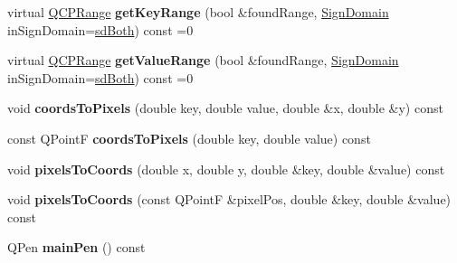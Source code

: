 \begin{DoxyCompactItemize}
\item 
\hypertarget{classQCPAbstractPlottable_a1acf2d2965d9b31328ec2cd018f9e0bc}{}virtual \hyperlink{classQCPRange}{Q\+C\+P\+Range} {\bfseries get\+Key\+Range} (bool \&found\+Range, \hyperlink{classQCPAbstractPlottable_a661743478a1d3c09d28ec2711d7653d8}{Sign\+Domain} in\+Sign\+Domain=\hyperlink{classQCPAbstractPlottable_a661743478a1d3c09d28ec2711d7653d8a082b98cfb91a7363a3b5cd17b0c1cd60}{sd\+Both}) const  =0\label{classQCPAbstractPlottable_a1acf2d2965d9b31328ec2cd018f9e0bc}

\item 
\hypertarget{classQCPAbstractPlottable_a807d1c14331f992a714b71b4cea7915c}{}virtual \hyperlink{classQCPRange}{Q\+C\+P\+Range} {\bfseries get\+Value\+Range} (bool \&found\+Range, \hyperlink{classQCPAbstractPlottable_a661743478a1d3c09d28ec2711d7653d8}{Sign\+Domain} in\+Sign\+Domain=\hyperlink{classQCPAbstractPlottable_a661743478a1d3c09d28ec2711d7653d8a082b98cfb91a7363a3b5cd17b0c1cd60}{sd\+Both}) const  =0\label{classQCPAbstractPlottable_a807d1c14331f992a714b71b4cea7915c}

\item 
\hypertarget{classQCPAbstractPlottable_ade710a776104b14c1c835168ce1bfc5c}{}void {\bfseries coords\+To\+Pixels} (double key, double value, double \&x, double \&y) const \label{classQCPAbstractPlottable_ade710a776104b14c1c835168ce1bfc5c}

\item 
\hypertarget{classQCPAbstractPlottable_a9fd1c9df8391781f05b0be22fbe91e13}{}const Q\+Point\+F {\bfseries coords\+To\+Pixels} (double key, double value) const \label{classQCPAbstractPlottable_a9fd1c9df8391781f05b0be22fbe91e13}

\item 
\hypertarget{classQCPAbstractPlottable_a10408828446e9e0681c46d65120f382e}{}void {\bfseries pixels\+To\+Coords} (double x, double y, double \&key, double \&value) const \label{classQCPAbstractPlottable_a10408828446e9e0681c46d65120f382e}

\item 
\hypertarget{classQCPAbstractPlottable_a3e2c361cfcdfd5d803ada4d333a07e15}{}void {\bfseries pixels\+To\+Coords} (const Q\+Point\+F \&pixel\+Pos, double \&key, double \&value) const \label{classQCPAbstractPlottable_a3e2c361cfcdfd5d803ada4d333a07e15}

\item 
\hypertarget{classQCPAbstractPlottable_a19276ed2382a3a06464417b8788b1451}{}Q\+Pen {\bfseries main\+Pen} () const \label{classQCPAbstractPlottable_a19276ed2382a3a06464417b8788b1451}


\end{DoxyCompactItemize}
